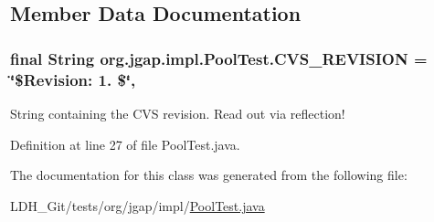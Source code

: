 \subsection{Member Data Documentation}
\hypertarget{classorg_1_1jgap_1_1impl_1_1_pool_test_a7e7b186d4511161432e00180ee8391c4}{
\subsubsection[{C\-V\-S\-\_\-\-R\-E\-V\-I\-S\-I\-O\-N}]{\setlength{\rightskip}{0pt plus 5cm}final String org.\-jgap.\-impl.\-Pool\-Test.\-C\-V\-S\-\_\-\-R\-E\-V\-I\-S\-I\-O\-N = \char`\"{}\$Revision\-: 1. \$\char`\"{}\hspace{0.3cm}{\ttfamily [static]}, {\ttfamily [private]}}}\label{classorg_1_1jgap_1_1impl_1_1_pool_test_a7e7b186d4511161432e00180ee8391c4}
String containing the C\-V\-S revision. Read out via reflection! 

Definition at line 27 of file Pool\-Test.\-java.



The documentation for this class was generated from the following file\-:\begin{DoxyCompactItemize}
\item 
L\-D\-H\-\_\-\-Git/tests/org/jgap/impl/\hyperlink{_pool_test_8java}{Pool\-Test.\-java}\end{DoxyCompactItemize}
